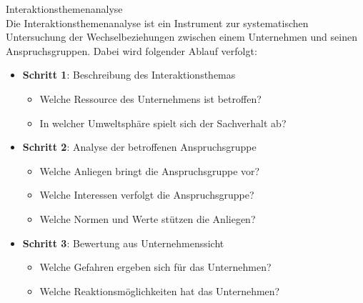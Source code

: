 \begin{concept}{Interaktionsthemenanalyse}\\
Die Interaktionsthemenanalyse ist ein Instrument zur systematischen Untersuchung der Wechselbeziehungen zwischen einem Unternehmen und seinen Anspruchsgruppen. Dabei wird folgender Ablauf verfolgt:
\begin{itemize}
    \item \textbf{Schritt 1}: Beschreibung des Interaktionsthemas
    \begin{itemize}
        \item Welche Ressource des Unternehmens ist betroffen?
        \item In welcher Umweltsphäre spielt sich der Sachverhalt ab?
    \end{itemize}
    \item \textbf{Schritt 2}: Analyse der betroffenen Anspruchsgruppe
    \begin{itemize}
        \item Welche Anliegen bringt die Anspruchsgruppe vor?
        \item Welche Interessen verfolgt die Anspruchsgruppe?
        \item Welche Normen und Werte stützen die Anliegen?
    \end{itemize}
    \item \textbf{Schritt 3}: Bewertung aus Unternehmenssicht
    \begin{itemize}
        \item Welche Gefahren ergeben sich für das Unternehmen?
        \item Welche Reaktionsmöglichkeiten hat das Unternehmen?
    \end{itemize}
\end{itemize}
\end{concept}


